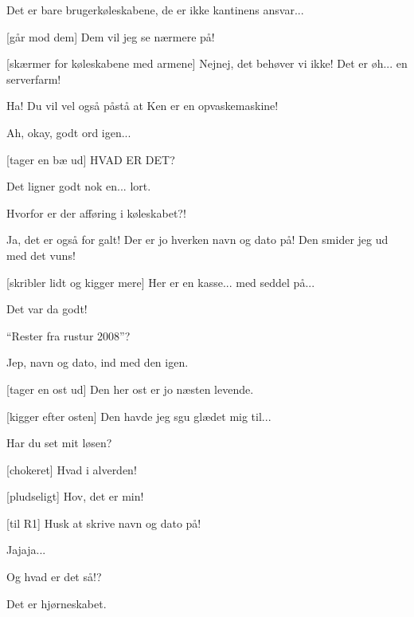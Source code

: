 \documentclass[a4paper,11pt]{article}
\begin{document}
\begin{sketch}
 Det er bare brugerkøleskabene, de er ikke kantinens ansvar...

[går mod dem] Dem vil jeg se nærmere på!

[skærmer for køleskabene med armene] Nejnej, det behøver vi
ikke!  Det er øh... en serverfarm!

 Ha!  Du vil vel også påstå at Ken er en opvaskemaskine!

 Ah, okay, godt ord igen...


[tager en bæ ud] HVAD ER DET?

 Det ligner godt nok en... lort.

 Hvorfor er der afføring i køleskabet?!

 Ja, det er også for galt!  Der er jo hverken navn og dato
på!  Den smider jeg ud med det vuns! 

[skribler lidt og kigger mere] Her er en kasse... med seddel på...

 Det var da godt!

 "`Rester fra rustur 2008"'?

 Jep, navn og dato, ind med den igen.  

[tager en ost ud] Den her ost er jo næsten levende.  

[kigger efter osten] Den havde jeg sgu glædet mig til...


 Har du set mit løsen?

[chokeret] Hvad i alverden!

[pludseligt] Hov, det er min!  

[til R1] Husk at skrive navn og dato på!

 Jajaja...


 Og hvad er det så!?

 Det er hjørneskabet.


\end{sketch}
\end{document}
